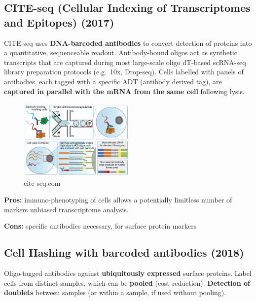 \hypertarget{cite-seq-cellular-indexing-of-transcriptomes-and-epitopes-2017}{%
\subsection{CITE-seq (Cellular Indexing of Transcriptomes and Epitopes)
(2017)}\label{cite-seq-cellular-indexing-of-transcriptomes-and-epitopes-2017}}

CITE-seq uses \textbf{DNA-barcoded antibodies} to convert detection of proteins
into a quantitative, sequenceable readout. Antibody-bound oligos act as
synthetic transcripts that are captured during most large-scale oligo
dT-based scRNA-seq library preparation protocols (e.g.~10x, Drop-seq). Cells labelled with panels
of antibodies, each tagged with a specific ADT (antibody derived tag),  are \textbf{captured in
parallel with the mRNA from the same cell} following lysis.

\begin{figure}
\centering
\includegraphics[width=0.5\textwidth]{images/Screen_Shot_2023-02-22_at_20-37-02.png}
\caption{cite-seq.com}
\end{figure}

\textbf{Pros:} immuno-phenotyping of cells allows a potentially
limitless number of markers unbiased transcriptome analysis.

\textbf{Cons:} specific antibodies necessary, for surface protein
markers

\hypertarget{cell-hashing-with-barcoded-antibodies}{%
\subsection{Cell Hashing with barcoded
antibodies (2018) }\label{cell-hashing-with-barcoded-antibodies}}

Oligo-tagged antibodies against \textbf{ubiquitously expressed} surface
proteins. Label cells from distinct samples, which can be \textbf{pooled}
(cost reduction). \textbf{Detection of doublets} between samples (or
within a sample, if used without pooling).

